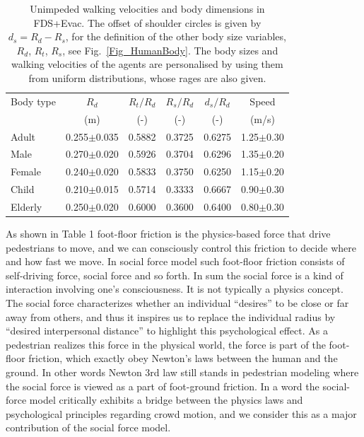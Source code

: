 \documentclass{article}
\begin{document}
%
%
%
\begin{table}[b!]
\begin{center}
\caption{Unimpeded walking velocities and body dimensions in FDS+Evac.
   The offset of shoulder circles is given by $d_s = R_d - R_s$, for the
   definition of the other body size variables, $R_d$, $R_t$, $R_s$,
   see Fig.~\protect\ref{Fig_HumanBody}.  The body sizes and walking
   velocities of the agents are personalised by using them from uniform
   distributions, whose rages are also given.}\label{Table_DefaultHumans}
\vspace{12pt}
\begin{tabular}{l c c c c c}\hline\hline
Body type & $R_d$& $R_t/R_d$ & $R_s/R_d$  & $d_s/R_d$ & Speed \\
          & (m)  & (-)   &  (-)    & (-)    & (m/s) \\ \hline
Adult     & 0.255$\pm$0.035 & 0.5882 & 0.3725 & 0.6275 &
          1.25$\pm$0.30 \\  %
Male      & 0.270$\pm$0.020 & 0.5926 & 0.3704 & 0.6296 &
          1.35$\pm$0.20 \\  %
Female    & 0.240$\pm$0.020 & 0.5833 & 0.3750 & 0.6250 &
          1.15$\pm$0.20 \\  %
Child     & 0.210$\pm$0.015 & 0.5714 & 0.3333 & 0.6667 &
          0.90$\pm$0.30 \\  %
Elderly   & 0.250$\pm$0.020 & 0.6000 & 0.3600 & 0.6400 &
          0.80$\pm$0.30 \\ \hline\hline  %
\end{tabular}
\end{center}
\end{table}
%


As shown in Table 1 foot-floor friction is the physics-based force that drive pedestrians to move, and we can consciously control this friction to decide where and how fast we move.  In social force model such foot-floor friction consists of self-driving force, social force and so forth.  In sum the social force is a kind of interaction involving one's consciousness.  It is not typically a physics concept.  The social force characterizes whether an individual “desires” to be close or far away from others, and thus it inspires us to replace the individual radius by “desired interpersonal distance” to highlight this psychological effect.   As a pedestrian realizes this force in the physical world, the force is part of the foot-floor friction, which exactly obey Newton's laws between the human and the ground.  In other words Newton 3rd law still stands in pedestrian modeling where the social force is viewed as a part of foot-ground friction.  In a word the social-force model critically exhibits a bridge between the physics laws and psychological principles regarding crowd motion, and we consider this as a major contribution of the social force model.
\end{document}
